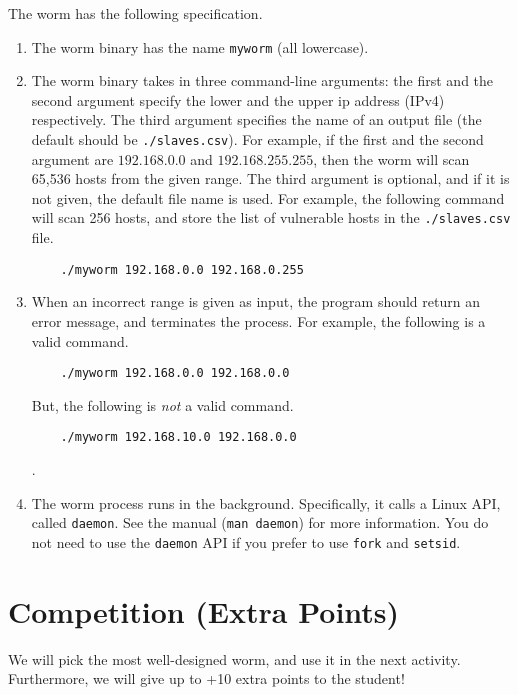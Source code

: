 \documentclass[a4paper, 11pt]{article}
\theoremstyle{definition}
\begin{document}
{The worm has the following specification.

\begin{enumerate}

  \item The worm binary has the name \texttt{myworm} (all lowercase).

  \item The worm binary takes in three command-line arguments: the
    first and the second argument specify the lower and the upper ip
    address (IPv4) respectively. The third argument specifies the name
    of an output file (the default should be \texttt{./slaves.csv}).
    For example, if the first and the second argument are
    $192.168.0.0$ and $192.168.255.255$, then the worm will scan
    65,536 hosts from the given range.
    The third argument is optional, and if it is not given, the
    default file name is used. For example, the following command will
    scan 256 hosts, and store the list of vulnerable hosts in the
    \texttt{./slaves.csv} file.
    \begin{verbatim}
    ./myworm 192.168.0.0 192.168.0.255
    \end{verbatim}

  \item When an incorrect range is given as input, the program should
    return an error message, and terminates the process. For example,
    the following is a valid command.
    \begin{verbatim}
    ./myworm 192.168.0.0 192.168.0.0
    \end{verbatim} But, the following is \emph{not} a valid command.
    \begin{verbatim}
    ./myworm 192.168.10.0 192.168.0.0
    \end{verbatim}.

  \item The worm process runs in the background. Specifically, it
    calls a Linux API, called \texttt{daemon}. See the manual
    (\texttt{man daemon}) for more information. You do not need to use
    the \texttt{daemon} API if you prefer to use \texttt{fork} and
    \texttt{setsid}.

\end{enumerate}

\section{Competition (Extra Points)}

We will pick the most well-designed worm, and use it in the next
activity. Furthermore, we will give up to +10 extra points to the
student!

}
\end{document}
